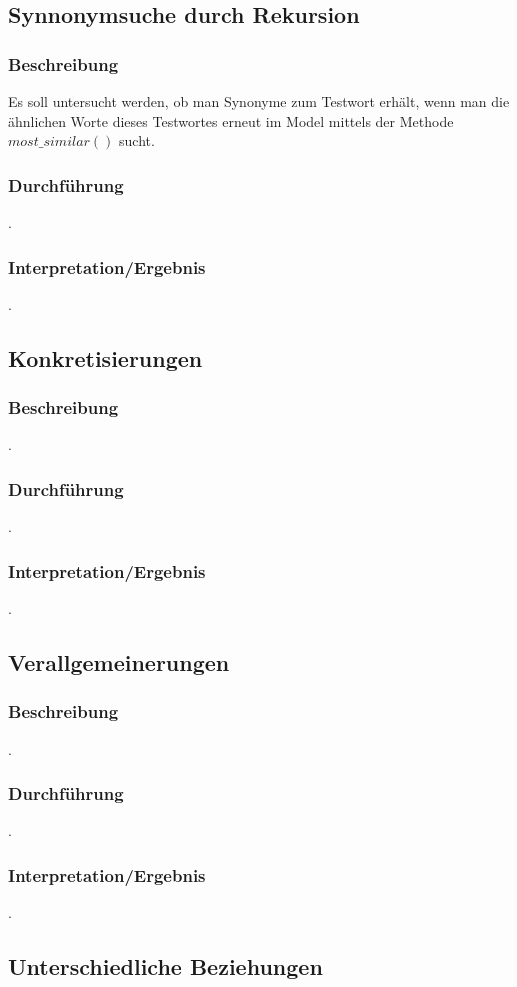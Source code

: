 \documentclass[12pt,a4paper]{article}
\begin{document}
	\subsection{Synnonymsuche durch Rekursion}
		\subsubsection{Beschreibung}
		Es soll untersucht werden, ob man Synonyme zum Testwort erhält, wenn man die ähnlichen Worte dieses Testwortes erneut im Model mittels der Methode $most\_similar()$ sucht. 
		\subsubsection{Durchführung}
		.
		\subsubsection{Interpretation/Ergebnis}
		.
	\subsection{Konkretisierungen}
		\subsubsection{Beschreibung}
		.
		\subsubsection{Durchführung}
		.
		\subsubsection{Interpretation/Ergebnis}
		.
	\subsection{Verallgemeinerungen}
		\subsubsection{Beschreibung}
		.
		\subsubsection{Durchführung}
		.
		\subsubsection{Interpretation/Ergebnis}
		.
	\subsection{Unterschiedliche Beziehungen}
\end{document}
